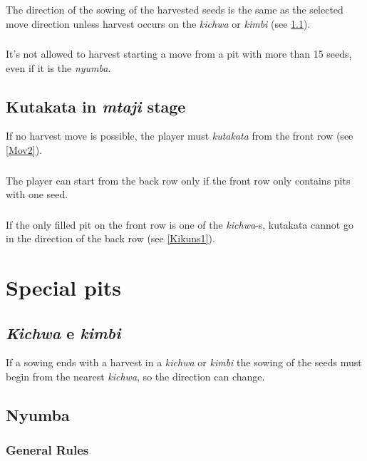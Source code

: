 \documentclass[12pt,a4paper]{article}
\begin{document}
\subsubsection{}\label{Hmims1}
The direction of the sowing of the harvested seeds is the same as the selected move direction unless harvest occurs on the {\it kichwa} or {\it kimbi} (see \ref{Kek}).
\subsubsection{}\label{Hmims2}
It's not allowed to harvest starting a move from a pit with more than 15 seeds, even if it is the {\it nyumba}.

\subsection{\bf Kutakata in {\it mtaji} stage}\label{Kims}
If no harvest move is possible, the player must {\it kutakata} from the front row (see \ref{Mov2}).

\subsubsection{}\label{Kims1} 
The player can start from the back row only if the front row only contains pits with one seed.
\subsubsection{}\label{Kims2}
If the only filled pit on the front row is one of the {\it kichwa}-s, kutakata cannot go in the direction of the back row (see \ref{Kikuns1}).

\section{Special pits}\label{Sp}

\subsection{\bf {\it Kichwa} e {\it kimbi}}\label{Kek}
If a sowing ends with a harvest in a {\it kichwa} or {\it kimbi} the sowing of the seeds must begin from the nearest {\it kichwa}, so the direction can change.
\subsection{\bf Nyumba}\label{Nyu}

\subsubsection{\bf General Rules}\label{NyuGR}
\end{document}
